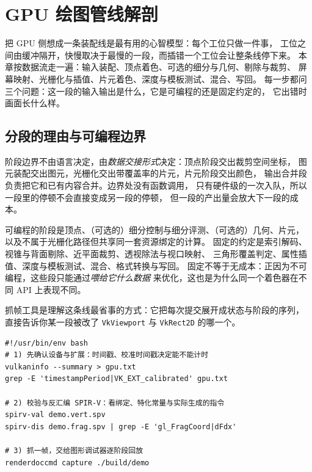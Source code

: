 \documentclass[12pt,a4paper,fontset=fandol]{ctexbook}
\newcommand{\Tp}[1]{\texttt{#1}}
\newcommand{\Lang}[1]{\textsf{#1}}
\newcommand{\DomGPU}{\Lang{GPU}}
\begin{document}
\chapter{GPU 绘图管线解剖}
\label{ch:ch02-raster-pipeline}

把 \DomGPU{} 侧想成一条装配线是最有用的心智模型：每个工位只做一件事，
工位之间由缓冲隔开，快慢取决于最慢的一段，而插错一个工位会让整条线停下来。
本章按数据流走一遍：输入装配、顶点着色、可选的细分与几何、剔除与裁剪、
屏幕映射、光栅化与插值、片元着色、深度与模板测试、混合、写回。
每一步都问三个问题：这一段的输入输出是什么，它是可编程的还是固定约定的，
它出错时画面长什么样。

\section{分段的理由与可编程边界}

阶段边界不由语言决定，由\emph{数据交接形式}决定：顶点阶段交出裁剪空间坐标，
图元装配交出图元，光栅化交出带覆盖率的片元，片元阶段交出颜色，
输出合并段负责把它和已有内容合并。边界处没有函数调用，
只有硬件级的一次入队，所以一段里的停顿不会直接变成另一段的停顿，
但一段的产出量会放大下一段的成本。

可编程的阶段是顶点、（可选的）细分控制与细分评测、（可选的）几何、片元，
以及不属于光栅化路径但共享同一套资源绑定的计算。
固定的约定是索引解码、视锥与背面剔除、近平面裁剪、透视除法与视口映射、
三角形覆盖判定、属性插值、深度与模板测试、混合、格式转换与写回。
固定不等于无成本：正因为不可编程，这些段只能通过\emph{喂给它什么数据}
来优化，这也是为什么同一个着色器在不同 API 上表现不同。

抓帧工具是理解这条线最省事的方式：它把每次提交展开成状态与阶段的序列，
直接告诉你某一段被改了 \Tp{VkViewport} 与 \Tp{VkRect2D} 的哪一个。

\begin{lstlisting}[style=shellstyle,caption={用命令行确认设备能力与着色器二进制，再交给抓帧工具逐阶段查看},label={lst:ch02-capture}]
#!/usr/bin/env bash
# 1) 先确认设备与扩展：时间戳、校准时间戳决定能不能计时
vulkaninfo --summary > gpu.txt
grep -E 'timestampPeriod|VK_EXT_calibrated' gpu.txt

# 2) 校验与反汇编 SPIR-V：看绑定、特化常量与实际生成的指令
spirv-val demo.vert.spv
spirv-dis demo.frag.spv | grep -E 'gl_FragCoord|dFdx'

# 3) 抓一帧，交给图形调试器逐阶段回放
renderdoccmd capture ./build/demo
\end{lstlisting}
\end{document}
